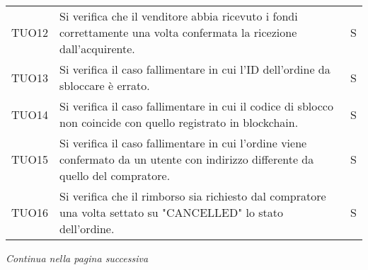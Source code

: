 \begin{table}[H]
\begin{tabular}{c|p{10cm}|c}
    TUO12 & Si verifica che il venditore abbia ricevuto i fondi correttamente una volta confermata la ricezione dall'acquirente.              & S \\
    TUO13 & Si verifica il caso fallimentare in cui l'ID dell'ordine da sbloccare è errato.                                                   & S \\
    TUO14 & Si verifica il caso fallimentare in cui il codice di sblocco non coincide con quello registrato in blockchain\glo{}.              & S \\
    TUO15 & Si verifica il caso fallimentare in cui l'ordine viene confermato da un utente con indirizzo differente da quello del compratore. & S \\
    TUO16 & Si verifica che il rimborso sia richiesto dal compratore una volta settato su "CANCELLED" lo stato dell'ordine.                   & S \\
  \end{tabular}
\end{table}
\begin{center}
  \textit{\small Continua nella pagina successiva}
\end{center}
